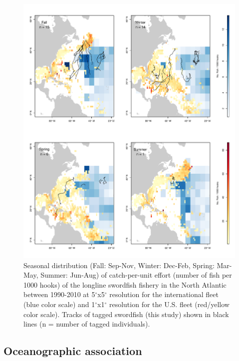 \begin{figure}[htbp]
\centering
\includegraphics[width=\textwidth]{images/C4_Fig2.pdf}
\caption[Seasonal distribution of catch-per-unit effort of the longline swordfish fishery in the North Atlantic]{Seasonal distribution (Fall: Sep-Nov, Winter: Dec-Feb, Spring: Mar-May, Summer: Jun-Aug) of catch-per-unit effort (number of fish per 1000 hooks) of the longline swordfish fishery in the North Atlantic between 1990-2010 at 5$^{\circ}$x5$^{\circ}$ resolution for the international fleet (blue color scale) and 1$^{\circ}$x1$^{\circ}$ resolution for the U.S. fleet (red/yellow color scale). Tracks of tagged swordfish (this study) shown in black lines (n = number of tagged individuals).}
\label{fig:c4f2}
\end{figure}

\subsection{Oceanographic association}

